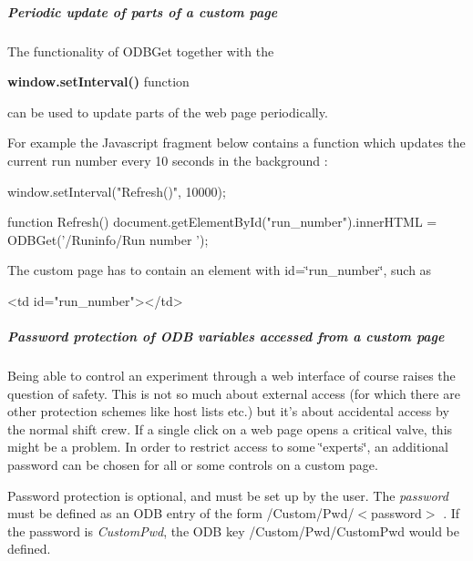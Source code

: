 \par


\par


\label{RC_mhttpd_custom_ODB_access_features_idx_mhttpd_page_custom_refresh_partial}
\hypertarget{RC_mhttpd_custom_ODB_access_features_idx_mhttpd_page_custom_refresh_partial}{}
 \hypertarget{RC_mhttpd_custom_ODB_access_features_RC_mhttpd_js_update_part}{}\subparagraph{Periodic update of parts of a custom page}\label{RC_mhttpd_custom_ODB_access_features_RC_mhttpd_js_update_part}
The functionality of ODBGet together with the
\begin{DoxyItemize}
\item {\bfseries window.setInterval()} function
\end{DoxyItemize}

can be used to update parts of the web page periodically. \par
 For example the Javascript fragment below contains a function which updates the current run number every 10 seconds in the background : 
\begin{DoxyCode}
  window.setInterval("Refresh()", 10000);

  function Refresh() {
    document.getElementById("run_number").innerHTML = ODBGet('/Runinfo/Run number
      ');
  }
\end{DoxyCode}


The custom page has to contain an element with id=\char`\"{}run\_\-number\char`\"{}, such as 
\begin{DoxyCode}
  <td id="run_number"></td>
\end{DoxyCode}
 \par
\par
\hypertarget{RC_mhttpd_custom_ODB_access_features_RC_mhttpd_custom_pw_protection}{}\subparagraph{Password protection of ODB variables accessed from a custom page}\label{RC_mhttpd_custom_ODB_access_features_RC_mhttpd_custom_pw_protection}
Being able to control an experiment through a web interface of course raises the question of safety. This is not so much about external access (for which there are other protection schemes like host lists etc.) but it's about accidental access by the normal shift crew. If a single click on a web page opens a critical valve, this might be a problem. In order to restrict access to some \char`\"{}experts\char`\"{}, an additional password can be chosen for all or some controls on a custom page.

Password protection is optional, and must be set up by the user. The {\itshape password\/} must be defined as an ODB entry of the form  /Custom/Pwd/$<$password$>$ . If the password is {\itshape CustomPwd\/}, the ODB key /Custom/Pwd/CustomPwd  would be defined.

